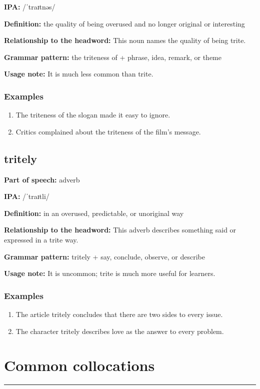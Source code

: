 \documentclass[11pt]{article}
\newcommand{\sectionrule}{\par\vspace{-0.5em}\noindent\textcolor{Accent}{\rule{\linewidth}{0.6pt}}\par}
\begin{document}
\textbf{IPA:} /ˈtraɪtnəs/

\textbf{Definition:} the quality of being overused and no longer original or interesting

\textbf{Relationship to the headword:} This noun names the quality of being trite.

\textbf{Grammar pattern:} the triteness of + phrase, idea, remark, or theme

\textbf{Usage note:} It is much less common than trite.

\subsubsection{Examples}
\begin{enumerate}
  \item The triteness of the slogan made it easy to ignore.
  \item Critics complained about the triteness of the film's message.
\end{enumerate}

\subsection{tritely}
\textbf{Part of speech:} adverb

\textbf{IPA:} /ˈtraɪtli/

\textbf{Definition:} in an overused, predictable, or unoriginal way

\textbf{Relationship to the headword:} This adverb describes something said or expressed in a trite way.

\textbf{Grammar pattern:} tritely + say, conclude, observe, or describe

\textbf{Usage note:} It is uncommon; trite is much more useful for learners.

\subsubsection{Examples}
\begin{enumerate}
  \item The article tritely concludes that there are two sides to every issue.
  \item The character tritely describes love as the answer to every problem.
\end{enumerate}

\section{Common collocations}
\sectionrule
\end{document}
